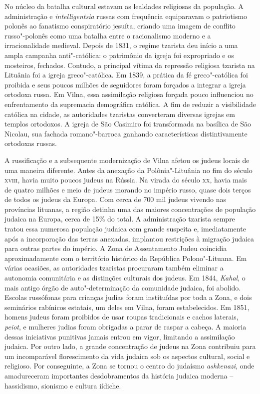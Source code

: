 No núcleo da batalha cultural estavam as lealdades religiosas da
população. A administração e \textit{intelligentsia} russas com frequência
equiparavam o patriotismo polonês ao fanatismo conspiratório jesuíta,
criando uma imagem de conflito russo"-polonês como uma batalha entre o
racionalismo moderno e a irracionalidade medieval. Depois de 1831, o
regime tzarista deu início a uma ampla campanha anti"-católica: o
patrimônio da igreja foi expropriado e os mosteiros, fechados. Contudo,
a principal vítima da repressão religiosa tzarista na Lituânia foi a
igreja greco"-católica. Em 1839, a prática da fé greco"-católica foi
proibida e seus poucos milhões de seguidores foram forçados a integrar a
igreja ortodoxa russa. Em Vilna, essa assimilação religiosa forçada
pouco influenciou no enfrentamento da supremacia demográfica católica. A
fim de reduzir a visibilidade católica na cidade, as autoridades
tzaristas converteram diversas igrejas em templos ortodoxos. A igreja de
São Casimiro foi transformada na basílica de São Nicolau, sua fachada
romano"-barroca ganhando características distintivamente ortodoxas
russas.

A russificação e a subsequente modernização de Vilna afetou os judeus
locais de uma maneira diferente. Antes da anexação da Polônia"-Lituânia
no fim do século \textsc{xviii}, havia muito poucos judeus na Rússia. Na virada do
século \textsc{xx}, havia mais de quatro milhões e meio de judeus morando no
império russo, quase dois terços de todos os judeus da Europa. Com cerca
de 700 mil judeus vivendo nas províncias lituanas, a região
detinha uma das maiores concentrações de população judaica na Europa, cerca de
15\% do total. A administração tzarista sempre
tratou essa numerosa população judaica com grande suspeita e,
imediatamente após a incorporação das terras anexadas, implantou
restrições à migração judaica para outras partes do império. A Zona de
Assentamento Judeu coincidia aproximadamente com o território histórico
da República Polono"-Lituana. Em várias ocasiões, as autoridades
tzaristas procuraram também eliminar a autonomia comunitária e as
distinções culturais dos judeus. Em 1844, \textit{Kahal}, o mais antigo órgão
de auto"-determinação da comunidade judaica, foi abolido. Escolas
russófonas para crianças judias foram instituídas por toda a Zona, e
dois seminários rabínicos estatais, um deles em Vilna, foram
estabelecidos. Em 1851, homens judeus foram proibidos de usar roupas
tradicionais e cachos laterais, \textit{peiot}, e mulheres judias foram
obrigadas a parar de raspar a cabeça. A maioria dessas iniciativas
punitivas jamais entrou em vigor, limitando a assimilação judaica. Por
outro lado, a grande concentração de judeus na Zona contribuiu para um
incomparável florescimento da vida judaica sob os aspectos cultural,
social e religioso. Por conseguinte, a Zona se tornou o centro do
judaísmo \textit{ashkenazi}, onde amadureceram importantes desdobramentos da
história judaica moderna -- hassidismo, sionismo e cultura iídiche.


